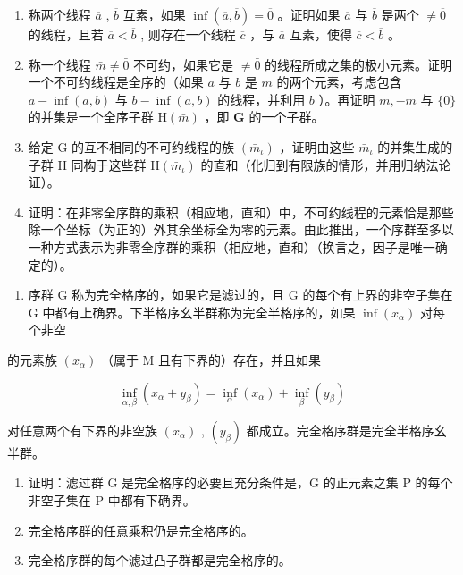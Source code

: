 \begin{enumerate}
\def\labelenumi{\alph{enumi})}
\setcounter{enumi}{2}
\item
  称两个线程 \(\overline{a}\) , \(\overline{b}\) 互素，如果 \(\inf (\overline{a},\overline{b}) = \overline{0}\) 。证明如果 \(\overline{a}\) 与 \(\overline{b}\) 是两个 \(\neq \overline{0}\) 的线程，且若 \(\overline{a} < \overline{b}\) , 则存在一个线程 \(\overline{c}\) ，与 \(\overline{a}\) 互素，使得 \(\overline{c} < \overline{b}\) 。
\item
  称一个线程 \(\bar{m} \neq \bar{0}\) 不可约，如果它是 \(\neq \bar{0}\) 的线程所成之集的极小元素。证明一个不可约线程是全序的（如果 \(a\) 与 \(b\) 是 \(\bar{m}\) 的两个元素，考虑包含 \(a - \inf(a, b)\) 与 \(b - \inf(a, b)\) 的线程，并利用 \(b\) ）。再证明 \(\bar{m}, -\bar{m}\) 与 \(\{0\}\) 的并集是一个全序子群 \(\mathrm{H}(\bar{m})\) ，即 \(\mathbf{G}\) 的一个子群。
\item
  给定 G 的互不相同的不可约线程的族 \((\bar{m}_{\iota})\) ，证明由这些 \(\bar{m}_{\iota}\) 的并集生成的子群 H 同构于这些群 \(\mathrm{H}(\bar{m}_{\iota})\) 的直和（化归到有限族的情形，并用归纳法论证）。
\item
  证明：在非零全序群的乘积（相应地，直和）中，不可约线程的元素恰是那些除一个坐标（为正的）外其余坐标全为零的元素。由此推出，一个序群至多以一种方式表示为非零全序群的乘积（相应地，直和）（换言之，因子是唯一确定的）。
\end{enumerate}

\begin{enumerate}
\def\labelenumi{\arabic{enumi})}
\setcounter{enumi}{28}
\tightlist
\item
  序群 G 称为完全格序的，如果它是滤过的，且 G 的每个有上界的非空子集在 G 中都有上确界。下半格序幺半群称为完全半格序的，如果 \(\inf(x_{\alpha})\) 对每个非空
\end{enumerate}

的元素族 \((x_{\alpha})\) （属于 M 且有下界的）存在，并且如果

\[
\inf _ {\alpha , \beta} (x _ {\alpha} + y _ {\beta}) = \inf _ {\alpha} (x _ {\alpha}) + \inf _ {\beta} (y _ {\beta})
\]

对任意两个有下界的非空族 \((x_{\alpha})\) , \((y_{\beta})\) 都成立。完全格序群是完全半格序幺半群。

\begin{enumerate}
\def\labelenumi{\alph{enumi})}
\item
  证明：滤过群 G 是完全格序的必要且充分条件是，G 的正元素之集 P 的每个非空子集在 P 中都有下确界。
\item
  完全格序群的任意乘积仍是完全格序的。
\item
  完全格序群的每个滤过凸子群都是完全格序的。
\end{enumerate}

